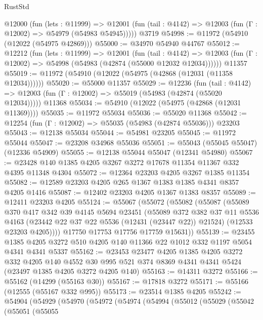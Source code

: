 \begin{lexlean}{RustStd}
\begin{coremodule}
    @12000
      (fun (lets : @11999) =>
      @12001 (fun (tail : @4142) => @12003 (fun (Γ : @12002) => @54979 (@54983 @54945)))))
    @3719
@54998 := @11972 (@54910 (@12022 (@54975 @42869)))
@55000 := @34970 @54940 @44767
@55012 := @12212
    (fun (lets : @11999) =>
    @12001
      (fun (tail : @4142) =>
      @12003 (fun (Γ : @12002) => @54998 (@54983 (@42874 (@55000 @12032 @12034))))))
    @11357
@55019 := @11972 (@54910 (@12022 (@54975 (@42868 (@12031 (@11358 @12034))))))
@55020 := @55000 @11357
@55029 := @12236
    (fun (tail : @4142) => @12003 (fun (Γ : @12002) => @55019 (@54983 (@42874 (@55020 @12034)))))
    @11368
@55034 := @54910 (@12022 (@54975 (@42868 (@12031 @11369))))
@55035 := @11972 @55034
@55036 := @55020 @11368
@55042 := @12254 (fun (Γ : @12002) => @55035 (@54983 (@42874 @55036))) @23203
@55043 := @12138 @55034
@55044 := @54981 @23205
@55045 := @11972 @55044
@55047 := @23208 @34968 @55036
@55051 := @55043 (@55045 @55047) (@12336 @54909)
@55055 := @12138 @55044 @55047 (@12341 @54980)
@55067 := @23428 @140 @1385 @4205 @3267 @3272 @17678 @11354 @11367 @332 @4395 @11348 @4304
@55072 := @12364 @23203 @4205 @3267 @1385 @11354
@55082 := @12589 @23203 @4205 @265 @1367 @1383 @1385 @4341 @8357 @4205 @1416
@55087 := @12402 @23203 @4205 @1367 @1383 @8357
@55089 := @12411 @23203 @4205
@55124 := @55067
    (@55072
      (@55082
        (@55087
          (@55089
            @370
            @417
            @342
            @39
            @4145
            @5694
            @23451
            (@55089
              @372
              @382
              @37
              @11
              @5536
              @4163
              (@23442 @22 @37 @22 @5536 (@12431 (@23447 @22)) @21524)
              (@12533 @23203 @4205))))
        @17750
        @17753
        @17756
        @17759
        @15631))
@55139 := @23455
    @1385
    @4205
    @3272
    @510
    @4205
    @140
    @11366
    @22
    @1012
    @332
    @1197
    @5054
    @4341
    @4341
    @5337
@55162 := @23453
    @23477
    @4205
    @1385
    @4205
    @3272
    @332
    @4205
    @140
    @4552
    @30
    @995
    @521
    @374
    @8369
    @4341
    @4341
    @5424
    (@23497 @1385 @4205 @3272 @4205 @140)
@55163 := @14311 @3272
@55166 := @55162 (@14299 (@55163 @30))
@55167 := @17818 @3272
@55171 := @55166 (@12555 (@55167 @332 @995))
@55173 := @23514 @1385 @4205
@55242 := @54904
    (@54929
      (@54970
        (@54972
          (@54974
            (@54994
              (@55012
                (@55029
                  (@55042
                    (@55051
                      (@55055

\end{coremodule}
\end{lexlean}
